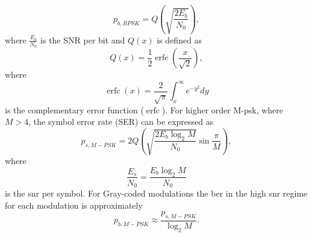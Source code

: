%
\begin{equation}
\label{eqn:BPSKmodBER}
p_{b,BPSK} = Q\left(\sqrt{\frac{2E_b}{N_0}}\right), 
\end{equation}
%
where $\frac{E_b}{N_0}$ is the SNR per bit and $Q(x)$ is defined as
%
\begin{equation}
\label{eqn:Qfunction}
Q(x)=\frac{1}{2}\operatorname{erfc}\left(\frac{x}{\sqrt{2}}\right),
\end{equation}
%
where
%
\begin{equation}
\label{eqn:Erfcfunction}
\operatorname{erfc}(x)=\frac{2}{\sqrt{\pi}}\int_x^{\infty}{e^{-y^2}dy}
\end{equation}
%
is the complementary error function ($\operatorname{erfc}$).
For higher order M-\gls{psk}, where $M>4$, the symbol error rate (SER) can be expressed as
%
\begin{equation}
\label{eqn:PSKmodBER}
p_{s,M-PSK} = 2Q\left( \sqrt{\frac{2E_b\log_2M}{N_0}}\sin{\frac{\pi}{M}}\right),
\end{equation}
%
where 
\begin{equation*}
\frac{E_s}{N_0}=\frac{E_b\log_2M}{N_0}
\end{equation*}
is the \gls{snr} per symbol. For Gray-coded modulations the \gls{ber} in the high \gls{snr} regime for each modulation is approximately
\begin{equation*} 
p_{b,M-PSK} \approx \frac{p_{s,M-PSK}}{\log_2M}.
\end{equation*}

